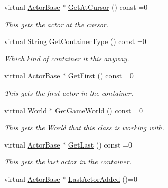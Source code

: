 \begin{DoxyCompactItemize}
virtual \hyperlink{classMezzanine_1_1ActorBase}{ActorBase} $\ast$ \hyperlink{classMezzanine_1_1ActorContainerBase_ae339ced44550bc493685ab7e499a9e65}{GetAtCursor} () const =0
\begin{DoxyCompactList}\small\item\em This gets the actor at the cursor. \item\end{DoxyCompactList}\item 
virtual \hyperlink{namespaceMezzanine_acf9fcc130e6ebf08e3d8491aebcf1c86}{String} \hyperlink{classMezzanine_1_1ActorContainerBase_a3516835341b82c71bc50b0a23be85af2}{GetContainerType} () const =0
\begin{DoxyCompactList}\small\item\em Which kind of container it this anyway. \item\end{DoxyCompactList}\item 
virtual \hyperlink{classMezzanine_1_1ActorBase}{ActorBase} $\ast$ \hyperlink{classMezzanine_1_1ActorContainerBase_a886539e9b55e8033b05e7b1aff8d2c59}{GetFirst} () const =0
\begin{DoxyCompactList}\small\item\em This gets the first actor in the container. \item\end{DoxyCompactList}\item 
virtual \hyperlink{classMezzanine_1_1World}{World} $\ast$ \hyperlink{classMezzanine_1_1ActorContainerBase_ae8fe5e37e411504c4b0e044b336118e8}{GetGameWorld} () const =0
\begin{DoxyCompactList}\small\item\em This gets the \hyperlink{classMezzanine_1_1World}{World} that this class is working with. \item\end{DoxyCompactList}\item 
virtual \hyperlink{classMezzanine_1_1ActorBase}{ActorBase} $\ast$ \hyperlink{classMezzanine_1_1ActorContainerBase_ad4fc923758bf4c15e8e6a0e0ad9e0de2}{GetLast} () const =0
\begin{DoxyCompactList}\small\item\em This gets the last actor in the container. \item\end{DoxyCompactList}\item 
virtual \hyperlink{classMezzanine_1_1ActorBase}{ActorBase} $\ast$ \hyperlink{classMezzanine_1_1ActorContainerBase_abccaf443a5acd1c96f7ae1a1cb751f16}{LastActorAdded} ()=0

\end{DoxyCompactItemize}
